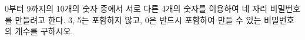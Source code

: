 0부터 9까지의 10개의 숫자 중에서 서로 다른 4개의 숫자를 이용하여 네 자리 비밀번호를 만들려고 한다. 3, 5는 포함하지 않고, 0은 반드시 포함하여 만들 수 있는 비밀번호의 개수를 구하시오.
